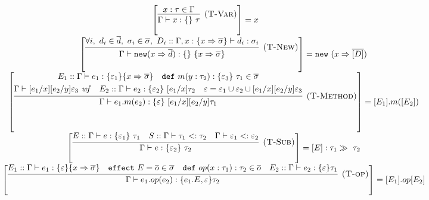 \documentclass{article}
\newcommand{\keywadj}[1]{\mathtt{#1}}
\newcommand{\keyw}[1]{\keywadj{#1}~}
\begin{document}
\begin{figure}[H]
\footnotesize{

\[
\begin{array}{cc}


 \left[  \infer[\textsc{(T-Var)}]
  {\Gamma \vdash x : \{ \}~\tau}
  {x : \tau \in \Gamma}  \right] = x
  \quad \quad \\[3ex]
~~~~~~~
\left[ \infer[\textsc{(T-New)}]
	{\Gamma \vdash \keywadj{new} (x \Rightarrow \overline{d}) : \{ \}~\{ x \Rightarrow \overline{\sigma} \}}
	{\forall i,~d_i \in \overline{d},~\sigma_i \in \overline{\sigma},~ D_i::\Gamma,x : \{ x \Rightarrow \overline{\sigma} \} \vdash d_i : \sigma_i} \right] = \keyw{new}(x\Rightarrow \overline{[D]})
	\\[3ex]
\left[ \infer[\textsc{(T-Method)}]
  {\Gamma \vdash e_1.m(e_2) : \{ \varepsilon \}~[e_1/x][e_2/y]\tau_1}
  {\begin{gathered} E_1::\Gamma \vdash e_1 : \{ \varepsilon_1 \} \{ x \Rightarrow \overline{\sigma} \}\quad \keyw{def} m(y : \tau_2) : \{ \varepsilon_3 \}~\tau_1 \in \overline{\sigma}\\
  \Gamma \vdash [e_1/x][e_2/y]\varepsilon_3~\mathit{wf}\quad E_2::\Gamma \vdash e_2 : \{ \varepsilon_2 \}~[e_1/x]\tau_2 \quad \varepsilon = \varepsilon_1 \cup \varepsilon_2 \cup [e_1/x][e_2/y]\varepsilon_3 \end{gathered}} \right]  = [E_1].m([E_2]) \\[3ex]

\left[ \infer[\textsc{(T-Sub)}]
  {\Gamma \vdash e : \{ \varepsilon_2 \}~\tau_2}
  {E::\Gamma \vdash e : \{ \varepsilon_1 \}~\tau_1 & S::\Gamma \vdash \tau_1 <: \tau_2 & \Gamma \vdash \varepsilon_1 <: \varepsilon_2} \right] =  [E] : \tau_1 \gg\ \tau_2 \\[3ex]

\left[ \infer[\textsc{(T-op)}]
  {\Gamma \vdash e_1.op(e_2): \{e_1.E, \varepsilon\} \tau _2}
  {E_1::\Gamma \vdash e_1: \{\varepsilon\} \{x \Rightarrow \overline{\sigma}\} \quad
   \keyw{effect} E = \overline{o} \in \overline{\sigma} \quad 
   \keyw{def} op(x: \tau_1): \tau_2 \in \overline{o} \quad 
   E_2::\Gamma \vdash e_2: \{\varepsilon \} \tau_1
  }
  \right] = [E_1].op[E_2]
  \\[3ex]
  

\end{array}\]}
\end{figure}
\end{document}

